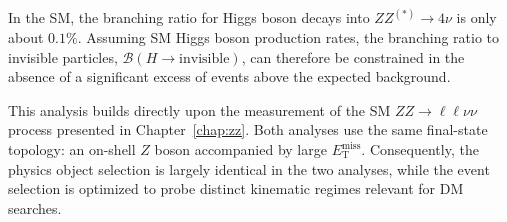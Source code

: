 In the SM, the branching ratio for Higgs boson decays into $ZZ^{(*)} \to 4\nu$ is only about $0.1\%$. Assuming SM Higgs boson production rates, the branching ratio to invisible particles, $\mathcal{B}(H \to \mathrm{invisible})$, can therefore be constrained in the absence of a significant excess of events above the expected background.

This analysis builds directly upon the measurement of the SM $ZZ \to \ell\ell\nu\nu$ process presented in Chapter~\ref{chap:zz}. Both analyses use the same final-state topology: an on-shell $Z$ boson accompanied by large $E_{\text{T}}^{\text{miss}}$. Consequently, the physics object selection is largely identical in the two analyses, while the event selection is optimized to probe distinct kinematic regimes relevant for DM searches.

    

